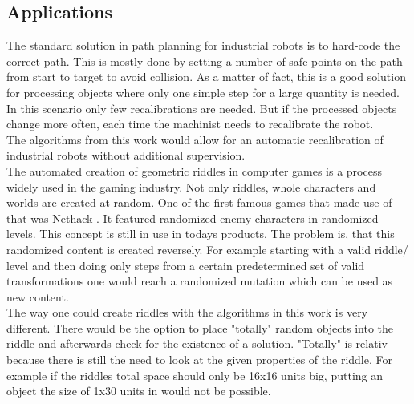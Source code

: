 \subsection{Applications}
The standard solution in path planning for industrial robots is to hard-code the correct path. This is mostly done by setting a number of safe points on the path from start to target to avoid collision. As a matter of fact, this is a good solution for processing objects where only one simple step for a large quantity is needed. In this scenario only few recalibrations are needed. But if the processed objects change more often, each time the machinist needs to recalibrate the robot. \\
The algorithms from this work would allow for an automatic recalibration of industrial robots without additional supervision.\\
\newline
The automated creation of geometric riddles in computer games is a process widely used in the gaming industry. Not only riddles, whole characters and worlds are created at random.
One of the first famous games that made use of that was Nethack \cite{nethack}. It featured randomized enemy characters in randomized levels. This concept is still in use in todays products. The problem is, that this randomized content is created reversely. For example starting with a valid riddle/ level and then  doing only steps from a certain predetermined set of valid transformations one would reach a randomized mutation which can be used as new content.\\
The way one could create riddles with the algorithms in this work is very different. There would be the option to place "totally" random objects into the riddle and afterwards check for the existence of a solution. "Totally" is relativ because there is still the need to look at the given properties of the riddle. For example if the riddles total space should only be 16x16 units big, putting an object the size of 1x30 units in would not be possible.

